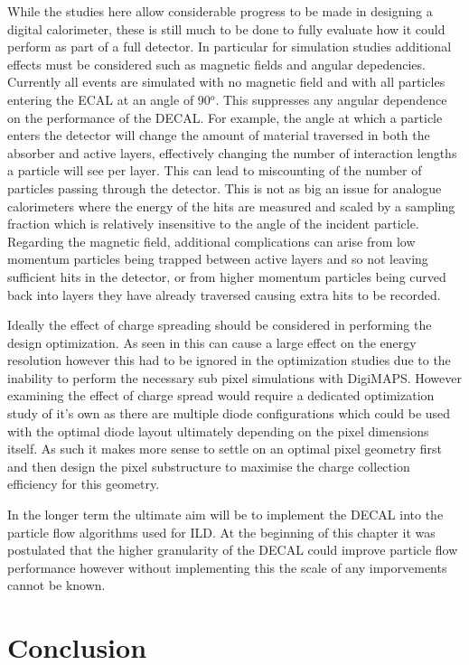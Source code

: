 While the studies here allow considerable progress to be made in designing a digital calorimeter, these is still much to be done to fully evaluate how it could perform as part of a full detector. In particular for simulation studies additional effects must be considered such as magnetic fields and angular depedencies. Currently all events are simulated with no magnetic field and with all particles entering the \ac{ECAL} at an angle of 90$^o$. This suppresses any angular dependence on the performance of the \ac{DECAL}. For example, the angle at which a particle enters the detector will change the amount of material traversed in both the absorber and active layers, effectively changing the number of interaction lengths a particle will see per layer. This can lead to miscounting of the number of particles passing through the detector. This is not as big an issue for analogue calorimeters where the energy of the hits are measured and scaled by a sampling fraction which is relatively insensitive to the angle of the incident particle. Regarding the magnetic field, additional complications can arise from low momentum particles being trapped between active layers and so not leaving sufficient hits in the detector, or from higher momentum particles being curved back into layers they have already traversed causing extra hits to be recorded.

Ideally the effect of charge spreading should be considered in performing the design optimization. As seen in  this can cause a large effect on the energy resolution however this had to be ignored in the optimization studies due to the inability to perform the necessary sub pixel simulations with DigiMAPS. However examining the effect of charge spread would require a dedicated optimization study of it's own as there are multiple diode configurations which could be used with the optimal diode layout ultimately depending on the pixel dimensions itself. As such it makes more sense to settle on an optimal pixel geometry first and then design the pixel substructure to maximise the charge collection efficiency for this geometry.

In the longer term the ultimate aim will be to implement the \ac{DECAL} into the particle flow algorithms used for \ac{ILD}. At the beginning of this chapter it was postulated that the higher granularity of the \ac{DECAL} could improve particle flow performance however without implementing this the scale of any imporvements cannot be known. 



\section{Conclusion}

